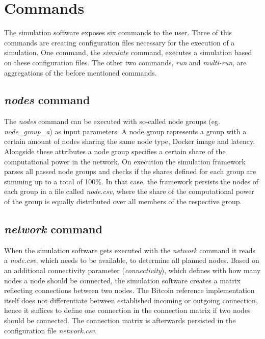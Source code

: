 \section{Commands}

The simulation software exposes six commands to the user.
Three of this commands are creating configuration files necessary for the execution of a simulation. One command, the \textit{simulate} command, executes a simulation based on these configuration files.
The other two commands, \textit{run} and \textit{multi-run}, are aggregations of the before mentioned commands.

\subsection{\textit{nodes} command} \label{chap:nodes_command}

The \textit{nodes} command can be executed with so-called node groups (eg. \textit{node\_group\_a}) as input parameters.
A node group represents a group with a certain amount of nodes sharing the same node type, Docker image and latency.
Alongside these attributes a node group specifies a certain share of the computational power in the network.
On execution the simulation framework parses all passed node groups and checks if the shares defined for each group are summing up to a total of 100\%.
In that case, the framework persists the nodes of each group in a file called \textit{node.csv}, where the share of the computational power of the group is equally distributed over all members of the respective group.

\subsection{\textit{network} command} \label{chap:network_command}

When the simulation software gets executed with the \textit{network} command it reads a \textit{node.csv}, which needs to be available, to determine all planned nodes.
Based on an additional connectivity parameter (\textit{connectivity}), which defines with how many nodes a node should be connected, the simulation software creates a matrix reflecting connections between two nodes.
The Bitcoin reference implementation itself does not differentiate between established incoming or outgoing connection, hence it suffices to define one connection in the connection matrix if two nodes should be connected.
The connection matrix is afterwards persisted in the configuration file \textit{network.csv}.

